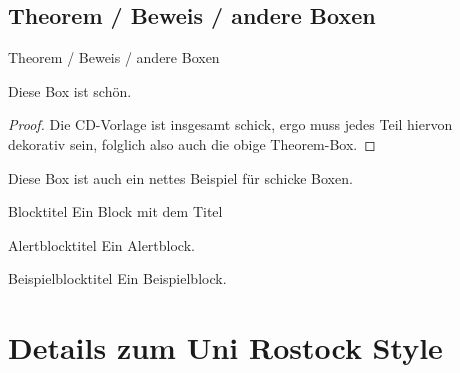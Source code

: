 \documentclass[10pt]{beamer} %
\begin{document}
\subsection{Theorem / Beweis / andere Boxen} 

\begin{frame}[allowframebreaks]{Theorem / Beweis / andere Boxen} %
   \begin{theorem}
      Diese Box ist sch\"on.
   \end{theorem}

   \begin{proof}
      Die CD-Vorlage ist insgesamt schick, ergo muss jedes Teil hiervon dekorativ sein, folglich also auch die obige Theorem-Box.
   \end{proof}

   \begin{Beispiel}
     Diese Box ist auch ein nettes Beispiel f\"ur schicke Boxen.
   \end{Beispiel}

   \begin{block}{Blocktitel}
      Ein Block mit dem Titel \insertblocktitle
   \end{block}

   \begin{alertblock}{Alertblocktitel}
      Ein Alertblock.
   \end{alertblock}

   \begin{exampleblock}{Beispielblocktitel}
      Ein Beispielblock.
   \end{exampleblock}

\end{frame}

\section{Details zum Uni Rostock Style}

\frame{\tableofcontents[currentsection]}
\end{document}
